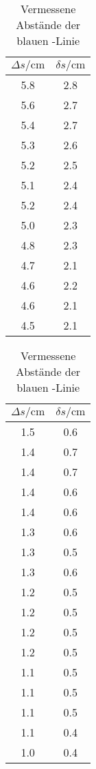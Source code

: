 \begin{table}
    \centering
    \caption{Vermessene Abstände der blauen \sigma-Linie}
    \label{tab:blau_sigma_Linie}
    \begin{tabular}{cc}
        \toprule
        $\Delta s/\si{\centi\meter}$ & $\delta s/\si{\centi\meter}$\\
        \midrule
        5.8 &2.8\\
        5.6 &2.7\\
        5.4 &2.7\\
        5.3 &2.6\\
        5.2 &2.5\\
        5.1 &2.4\\
        5.2 &2.4\\
        5.0 &2.3\\
        4.8 &2.3\\
        4.7 &2.1\\
        4.6 &2.2\\
        4.6 &2.1\\
        4.5 &2.1\\
        \bottomrule
    \end{tabular}
\end{table}


\begin{table}
    \centering
    \caption{Vermessene Abstände der blauen \pi-Linie}
    \label{tab:blau_pi_Linie}
    \begin{tabular}{cc}
        \toprule
        $\Delta s/\si{\centi\meter}$ & $\delta s/\si{\centi\meter}$\\
        \midrule
        1.5 &0.6\\
        1.4 &0.7\\
        1.4 &0.7\\
        1.4 &0.6\\
        1.4 &0.6\\
        1.3 &0.6\\
        1.3 &0.5\\
        1.3 &0.6\\
        1.2 &0.5\\
        1.2 &0.5\\
        1.2 &0.5\\
        1.2 &0.5\\
        1.1 &0.5\\
        1.1 &0.5\\
        1.1 &0.5\\
        1.1 &0.4\\
        1.0 &0.4\\
        \bottomrule
    \end{tabular}
\end{table}